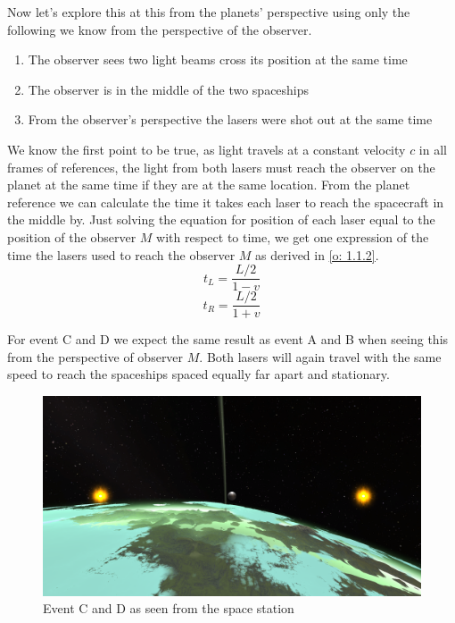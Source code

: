 \documentclass[reprint,english,notitlepage]{revtex4-2}
\begin{document}
  Now let's explore this at this from the planets' perspective using only the following we know from the perspective of the observer.
  
  \begin{enumerate}
    \item The observer sees two light beams cross its position at the same time
    \item The observer is in the middle of the two spaceships 
    \item From the observer's perspective the lasers were shot out at the same time
  \end{enumerate}
  
  We know the first point to be true, as light travels at a constant velocity $ c $ in all frames of references, the light from both lasers must reach the observer on the planet at the same time if they are at the same location.
  From the planet reference we can calculate the time it takes each laser to reach the spacecraft in the middle by. Just solving the equation for position of each laser equal to the position of the observer $ M $ with respect to time, we get one expression of the time the lasers used to reach the observer $ M $ as derived in \ref{o: 1.1.2}. 
  \begin{equation}\label{eq: t_L}
    t_L = \frac{L /2}{1 - v}
  \end{equation}
  \begin{equation}\label{eq: t_R}
    t_R = \frac{L / 2}{1 + v}
  \end{equation}
  
  
  For event C and D we expect the same result as event A and B when seeing this from the perspective of observer $ M $. Both lasers will again travel with the same speed to reach the spaceships spaced equally far apart and stationary. 
  \begin{figure}[h!]
    \centering
    \includegraphics[scale = .1]{figures/C_D_Station.png}
    \caption{Event C and D as seen from the space station}
    \label{fig: C_D station}
  \end{figure}
  
\end{document}
